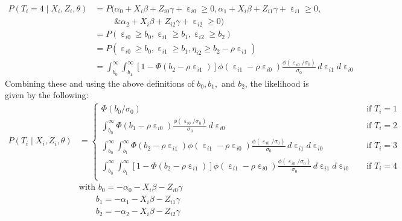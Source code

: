 \documentclass[12pt]{article}
\DeclareMathOperator{\eps}{\varepsilon}
\begin{document}
\begin{align*}
    P(T_i = 4 \mid X_i, Z_i, \theta) &= P(\alpha_0 + X_i \beta + Z_{i0} \gamma + \eps_{i0} \geq 0, \alpha_1 + X_i \beta + Z_{i1} \gamma + \eps_{i1} \geq 0, \\
    &\qquad \text{ \& } \alpha_2 + X_i \beta + Z_{i2} \gamma + \eps_{i2} \geq 0 )\\
    &= P( \eps_{i0} \geq b_0,  \eps_{i1} \geq b_1, \eps_{i2}\geq b_2)\\
    &= P( \eps_{i0} \geq b_0,  \eps_{i1} \geq b_1, \eta_{i2} \geq b_2 - \rho \eps_{i1})\\
    &= \int_{b_0}^{\infty} \int_{b_1}^{\infty} [1 - \Phi(b_2 - \rho \eps_{i1})]\phi(\eps_{i1} - \rho \eps_{i0}) \frac{\phi(\eps_{i0}/\sigma_0)}{\sigma_0} \, d \eps_{i1} d \eps_{i0}
\end{align*}
Combining these and using the above definitions of $b_0, b_1,$ and $b_2$, the likelihood is given by the following:
\begin{align*}
    P(T_i \mid X_i, Z_i, \theta) &= \begin{cases}
        \Phi(b_0/\sigma_0) \quad &\text{if } T_i = 1\\
        \int_{b_0}^{\infty} \Phi(b_1 - \rho \eps_{i0}) \frac{\phi(\eps_{i0}/\sigma_0)}{\sigma_0} \, d \eps_{i0} \quad &\text{if } T_i = 2\\
        \int_{b_0}^{\infty} \int_{b_1}^{\infty} \Phi(b_2 - \rho \eps_{i1})\phi(\eps_{i1} - \rho \eps_{i0}) \frac{\phi(\eps_{i0}/\sigma_0)}{\sigma_0} \, d \eps_{i1} d \eps_{i0} \quad &\text{if } T_i = 3\\
        \int_{b_0}^{\infty} \int_{b_1}^{\infty} [1 - \Phi(b_2 - \rho \eps_{i1})]\phi(\eps_{i1} - \rho \eps_{i0}) \frac{\phi(\eps_{i0}/\sigma_0)}{\sigma_0} \, d \eps_{i1} d \eps_{i0} \quad &\text{if } T_i = 4\\
    \end{cases}\\
    &\text{with } b_0 = - \alpha_0 - X_i \beta - Z_{i0}\gamma\\ 
    & \qquad b_1 = - \alpha_1 - X_i \beta - Z_{i1}\gamma\\
    & \qquad b_2 = - \alpha_2 - X_i \beta - Z_{i2}\gamma
\end{align*}
\end{document}
